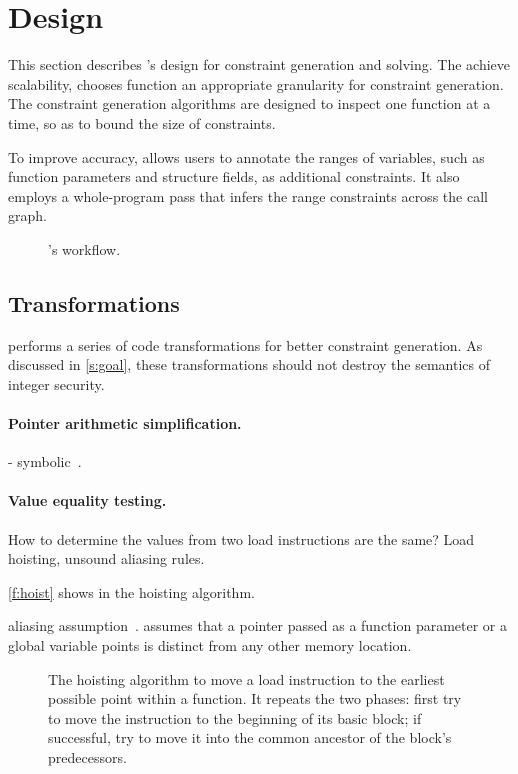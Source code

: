 \section{Design}
\label{s:gen}

This section describes \sys's design for constraint generation and
solving.  The achieve scalability, \sys chooses function an appropriate
granularity for constraint generation.  The constraint generation
algorithms are designed to inspect one function at a time, so as
to bound the size of constraints.

To improve accuracy, \sys allows users to annotate the ranges of
variables, such as function parameters and structure fields, as
additional constraints. It also employs a whole-program pass that
infers the range constraints across the call graph.

\begin{figure}
\centering
\resizebox{0.9\linewidth}{!}{

}
\caption{\sys's workflow.}
\label{f:flow}
\end{figure}

\subsection{Transformations}

\sys performs a series of code transformations for better constraint
generation.  As discussed in \autoref{s:goal}, these transformations
should not destroy the semantics of integer security.

\paragraph{Pointer arithmetic simplification.}
- symbolic~\cite{engelen:symbolic}.

\paragraph{Value equality testing.}
How to determine the values from two load instructions
are the same? Load hoisting, unsound aliasing rules.

\autoref{f:hoist} shows in the hoisting algorithm.

aliasing assumption~\cite{livshits:ipssa}.
\sys assumes that a pointer passed as a function parameter or a
global variable points is distinct from any other memory location.


\begin{figure}

\caption{The hoisting algorithm to move a load instruction to the
earliest possible point within a function.  It repeats the two
phases: first try to move the instruction to the beginning of its
basic block; if successful, try to move it into the common ancestor
of the block's predecessors.}
\label{f:hoist}
\end{figure}

